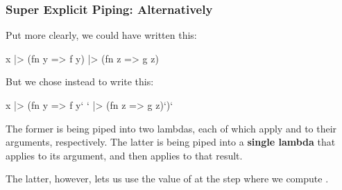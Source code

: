 \documentclass[aspectratio=169]{beamer}
\begin{document}
\begin{frame}[fragile]
  \frametitle{Super Explicit Piping: Alternatively}

  Put more clearly, we could have written this:

  \begin{codeblock}
    x
    |> (fn y => f y)
    |> (fn z => g z)
  \end{codeblock}

  \pause
  \vspace{\fill}

  But we chose instead to write this:

  \begin{codeblock}
    x
    |> (fn y => f y` `
    |> (fn z => g z)`)`
  \end{codeblock}

  \pause
  \vspace{\fill}

  The former is  being piped into two lambdas, each of which
  apply  and  to their arguments, respectively. The
  latter is  being piped into a \textbf{single lambda} that
  applies  to its argument, and then applies  to that
  result.

  \pause
  \vspace{\fill}

  The latter, however, lets us use the value of  at the
  step where we compute .
\end{frame}






\end{document}
